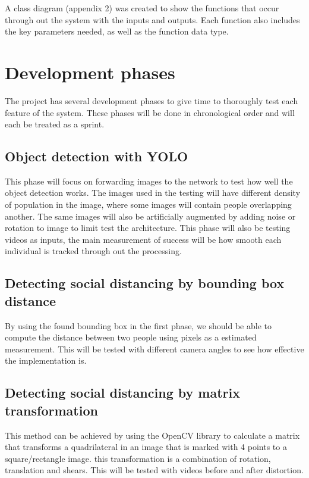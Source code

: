 \documentclass[12pt]{report}
\begin{document}
A class diagram (appendix 2) was created to show the functions that occur through out the system with the inputs and outputs. Each function also includes the key parameters needed, as well as the function data type.

\section{Development phases}

The project has several development phases to give time to thoroughly test each feature of the system. These phases will be done in chronological order and will each be treated as a sprint.

\subsection*{Object detection with YOLO}

This phase will focus on forwarding images to the network to test how well the object detection works. The images used in the testing will have different density of population in the image, where some images will contain people overlapping another. The same images will also be artificially augmented by adding noise or rotation to image to limit test the architecture. This phase will also be testing videos as inputs, the main measurement of success will be how smooth each individual is tracked through out the processing.

\subsection*{Detecting social distancing by bounding box distance}

By using the found bounding box in the first phase, we should be able to compute the distance between two people using pixels as a estimated measurement. This will be tested with different camera angles to see how effective the implementation is.

\subsection*{Detecting social distancing by matrix transformation}

This method can be achieved by using the OpenCV library to calculate a matrix that transforms a quadrilateral in an image that is marked with 4 points to a square/rectangle image. this transformation is a combination of rotation, translation and shears. This will be tested with videos before and after distortion.
\end{document}
